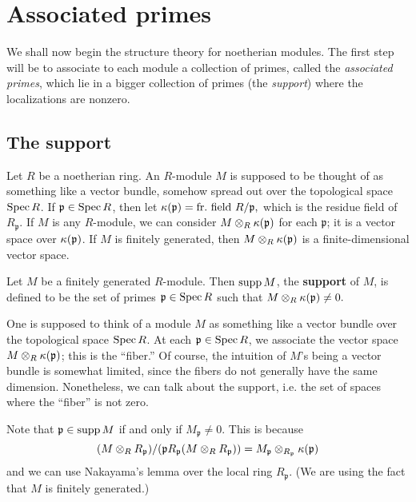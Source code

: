 \section{Associated primes}

We shall now begin the structure theory for noetherian modules. The first step
will be to associate to each module a collection of primes, called the
\emph{associated primes}, which lie in a bigger collection of primes (the
\emph{support}) where the
localizations are nonzero.

\subsection{The support}
 Let $R$ be a  noetherian ring.  An $R$-module $M$ is supposed to be thought
 of as something like a vector bundle, somehow
spread out over the topological space $\operatorname{Spec} R$. If $\mathfrak{p} \in \operatorname{Spec} R$, then  let
\( \kappa(\mathfrak{p}) = \mathrm{fr.  \ field \ } R/\mathfrak{p}  ,\)
which is the residue field of $R_{\mathfrak{p}}$. If $M$ is any $R$-module, we
can consider $M \otimes_R \kappa(\mathfrak{p})$ for each $\mathfrak{p}$; it is a
vector space over $\kappa(\mathfrak{p})$. If $M$ is finitely generated, then $M \otimes_R
\kappa(\mathfrak{p})$ is a finite-dimensional vector space.

\begin{definition} 
Let $M$ be a finitely generated $R$-module. Then $\operatorname{supp} M$, the
\textbf{support} of $M$,  is defined to be the set of primes
$\mathfrak{p} \in \operatorname{Spec} R$ such that
\( M \otimes_R \kappa(\mathfrak{p}) \neq 0.  \)
\end{definition} 

One is  supposed to think of a module $M$ as something like a vector bundle
over the topological space
$\operatorname{Spec} R$. At each $\mathfrak{p} \in \operatorname{Spec} R$, we associate the vector space $M
\otimes_R \kappa(\mathfrak{p})$; this is the ``fiber.'' Of course, the intuition
of  $M$'s being a vector bundle is somewhat limited, since the fibers
do not generally have  the same dimension.
Nonetheless, we can talk about the support, i.e. the set of spaces where the
``fiber'' is not zero.

Note that $\mathfrak{p} \in \operatorname{supp} M$ if and only if $M_{\mathfrak{p}} \neq 0$. This is
because
\[ (M \otimes_R R_{\mathfrak{p}})/( \mathfrak{p} R_{\mathfrak{p}} (M \otimes_R
R_{\mathfrak{p}}))  = M_{\mathfrak{p}}
\otimes_{R_{\mathfrak{p}}} \kappa(\mathfrak{p})  \]
and we can use Nakayama's lemma over the local ring $R_{\mathfrak{p}}$.  (We
are using the fact that $M$ is finitely generated.)

